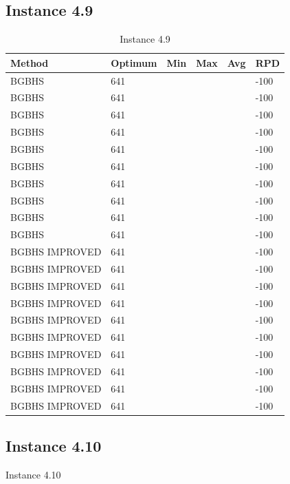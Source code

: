 \subsection{Instance 4.9}
\begin{table}[H]
\centering
\begin{tabular}{ | l | l | l | l | l | l | }
\hline
	Method & Optimum & Min & Max & Avg & RPD \\ \hline
	BGBHS & 641 &  &  &  & -100 \\ \hline
	BGBHS & 641 &  &  &  & -100 \\ \hline
	BGBHS & 641 &  &  &  & -100 \\ \hline
	BGBHS & 641 &  &  &  & -100 \\ \hline
	BGBHS & 641 &  &  &  & -100 \\ \hline
	BGBHS & 641 &  &  &  & -100 \\ \hline
	BGBHS & 641 &  &  &  & -100 \\ \hline
	BGBHS & 641 &  &  &  & -100 \\ \hline
	BGBHS & 641 &  &  &  & -100 \\ \hline
	BGBHS & 641 &  &  &  & -100 \\ \hline
	BGBHS IMPROVED & 641 &  &  &  & -100 \\ \hline
	BGBHS IMPROVED & 641 &  &  &  & -100 \\ \hline
	BGBHS IMPROVED & 641 &  &  &  & -100 \\ \hline
	BGBHS IMPROVED & 641 &  &  &  & -100 \\ \hline
	BGBHS IMPROVED & 641 &  &  &  & -100 \\ \hline
	BGBHS IMPROVED & 641 &  &  &  & -100 \\ \hline
	BGBHS IMPROVED & 641 &  &  &  & -100 \\ \hline
	BGBHS IMPROVED & 641 &  &  &  & -100 \\ \hline
	BGBHS IMPROVED & 641 &  &  &  & -100 \\ \hline
	BGBHS IMPROVED & 641 &  &  &  & -100 \\ \hline
\end{tabular}

\caption{Instance 4.9}
\label{tblscp49}
\end{table}
\newpage

\subsection{Instance 4.10}
\begin{table}[H]
\centering

\caption{Instance 4.10}
\label{tblscp410}
\end{table}
\newpage

